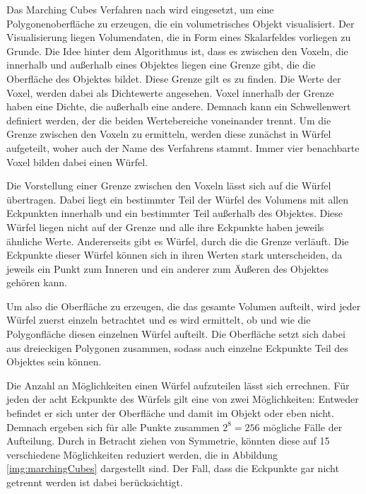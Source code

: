Das Marching Cubes Verfahren nach \cite{Lorensen87} wird eingesetzt, um eine Polygonenoberfläche zu erzeugen, die ein volumetrisches Objekt visualisiert. 
Der Visualisierung liegen Volumendaten, die in Form eines Skalarfeldes vorliegen zu Grunde.
Die Idee hinter dem Algorithmus ist, dass es zwischen den Voxeln, die innerhalb und außerhalb eines Objektes liegen eine Grenze gibt, die die Oberfläche des Objektes bildet. Diese Grenze gilt es zu finden. 
Die Werte der Voxel, werden dabei als Dichtewerte angesehen. Voxel innerhalb der Grenze haben eine Dichte, die außerhalb eine andere. Demnach kann ein Schwellenwert definiert werden, der die beiden Wertebereiche voneinander trennt.
Um die Grenze zwischen den Voxeln zu ermitteln, werden diese zunächst in Würfel aufgeteilt, woher auch der Name des Verfahrens stammt. Immer vier benachbarte Voxel bilden dabei einen Würfel.  

Die Vorstellung einer Grenze zwischen den Voxeln lässt sich auf die Würfel übertragen. Dabei liegt ein bestimmter Teil der Würfel des Volumens mit allen Eckpunkten innerhalb und ein bestimmter Teil außerhalb des Objektes. Diese Würfel liegen nicht auf der Grenze und alle ihre Eckpunkte haben jeweils ähnliche Werte. Andererseits gibt es Würfel, durch die die Grenze verläuft. Die Eckpunkte dieser Würfel können sich in ihren Werten stark unterscheiden, da jeweils ein Punkt zum Inneren und ein anderer zum Äußeren des Objektes gehören kann. 

Um also die Oberfläche zu erzeugen, die das gesamte Volumen aufteilt, wird jeder Würfel zuerst einzeln betrachtet und es wird ermittelt, ob und wie die Polygonfläche diesen einzelnen Würfel aufteilt.  Die Oberfläche setzt sich dabei aus dreieckigen Polygonen zusammen, sodass auch einzelne Eckpunkte Teil des Objektes sein können.

Die Anzahl an Möglichkeiten einen Würfel aufzuteilen lässt sich errechnen. Für jeden der acht Eckpunkte des Würfels gilt eine von zwei Möglichkeiten: Entweder befindet er sich unter der Oberfläche und damit im Objekt oder eben nicht. Demnach ergeben sich für alle Punkte zusammen $2^8=256$ mögliche Fälle der Aufteilung. \cite{aigner07} Durch in Betracht ziehen von Symmetrie, könnten diese auf 15 verschiedene Möglichkeiten reduziert werden, die in Abbildung \ref{img:marchingCubes} dargestellt sind. Der Fall, dass die Eckpunkte gar nicht getrennt werden ist dabei berücksichtigt. 

